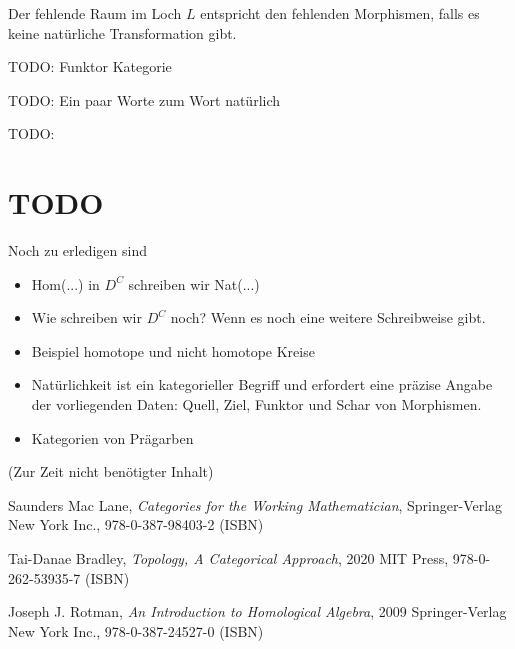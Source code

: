 \documentclass[a4paper]{amsart}
\theoremstyle{definition}
\begin{document}
Der fehlende Raum im Loch $L$ entspricht den fehlenden Morphismen, falls es keine natürliche Transformation gibt.

TODO: Funktor Kategorie

TODO: Ein paar Worte zum Wort natürlich

TODO: 

\section{TODO}
Noch zu erledigen sind
\begin{itemize}
   \item Hom(...) in $D^C$ schreiben wir Nat(...)
   \item Wie schreiben wir $D^C$ noch? Wenn es noch eine weitere Schreibweise gibt.
   \item Beispiel homotope und nicht homotope Kreise
   \item Natürlichkeit ist ein kategorieller Begriff und erfordert eine präzise Angabe der vorliegenden Daten: Quell, Ziel, Funktor und Schar von Morphismen.
   \item Kategorien von Prägarben
\end{itemize}



\begin{backup}
    (Zur Zeit nicht benötigter Inhalt)
\end{backup}

\begin{thebibliography}{9}

      Saunders Mac Lane, \emph{Categories for the Working Mathematician},
      Springer-Verlag New York Inc., 978-0-387-98403-2 (ISBN)
      
      Tai-Danae Bradley, \emph{Topology, A Categorical Approach},
      2020 MIT Press, 978-0-262-53935-7 (ISBN)

   	Joseph J. Rotman, \emph{An Introduction to Homological Algebra},
   	2009 Springer-Verlag New York Inc., 978-0-387-24527-0 (ISBN)
      
\end{thebibliography}
\end{document}
